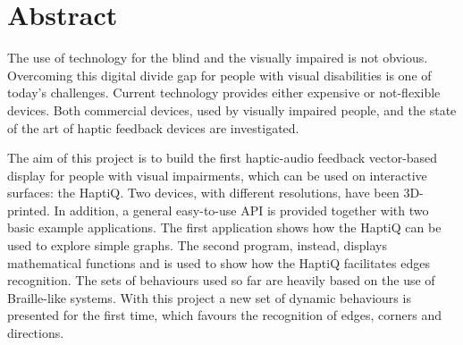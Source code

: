 \section{Abstract}

The use of technology for the blind and the visually impaired is not obvious. Overcoming this digital divide gap for people with visual disabilities is one of today's challenges. Current technology provides either expensive or not-flexible devices. Both commercial devices, used by visually impaired people, and the state of the art of haptic feedback devices are investigated.

The aim of this project is to build the first haptic-audio feedback vector-based display for people with visual impairments, which can be used on interactive surfaces: the HaptiQ. Two devices, with different resolutions, have been 3D-printed. In addition, a general easy-to-use API is provided together with two basic example applications. The first application shows how the HaptiQ can be used to explore simple graphs. The second program, instead, displays mathematical functions and is used to show how the HaptiQ facilitates edges recognition.
The sets of behaviours used so far are heavily based on the use of Braille-like systems. With this project a new set of dynamic behaviours is presented for the first time, which favours the recognition of edges, corners and directions. 